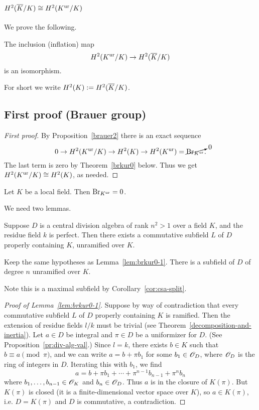 \section{$H^2(\overline{K}/K)\cong H^2(K^{\text{ur}}/K)$}
We prove the following.
\begin{thm}
The inclusion (inflation) map
\[
H^2(K^{\text{ur}}/K)\to H^2(\overline{K}/K)
\]
is an isomorphism.
\end{thm}
For short we write $H^2(K):=H^2(\overline{K}/K)$.
\subsection{First proof (Brauer group)}
\begin{proof}[First proof]
By Proposition~\ref{brauer2} there is an exact sequence
\[
0\to H^2(K^{\text{ur}}/K)\to H^2(K)\to H^2(K^{\text{ur}})= \cancelto{0}{\operatorname{Br}_{K^{\text{ur}}}}.
\]
The last term is zero by Theorem~\ref{brkur0} below. %
Thus we get $H^2(K^{\text{ur}}/K)\cong H^2(K)$, as needed.
\end{proof}
\begin{thm}
Let $K$ be a local field. Then $\operatorname{Br}_{K^{\text{ur}}}=0$. 
\end{thm}
We need two lemmas.
\begin{lem}
Suppose $D$ is a central division algebra of rank $n^2>1$ over a field $K$, and the residue field $k$ is perfect. Then there exists a  commutative subfield $L$ of $D$ properly containing $K$, unramified over $K$.
\end{lem}
\begin{lem}
Keep the same hypotheses as Lemma~\ref{lem:brkur0-1}. There is a subfield of $D$ of degree $n$ unramified over $K$.
\end{lem}
Note this is a maximal subfield by Corollary~\ref{cor:csa-split}.
\begin{proof}[Proof of Lemma~\ref{lem:brkur0-1}]
Suppose by way of contradiction that every commutative subfield $L$ of $D$ properly containing $K$ is ramified. Then the extension of residue fields $l/k$ must be trivial (see Theorem~\ref{decomposition-and-inertia}). Let $a\in D$ be integral and $\pi\in D$ be a uniformizer for $D$.
(See Proposition~\ref{pr:div-alg-val}.) 
Since $l=k$, there exists $b\in K$ such that $b\equiv a\pmod{\pi}$, and we can write $a=b+\pi b_1$ for some $b_1\in \mathscr{O}_D$, where $\mathscr{O}_D$ is the ring of integers in $D$. Iterating this with $b_1$, we find 
\[
a=b+\pi b_1+\cdots +\pi^{n-1} b_{n-1}+\pi^n b_n
\]
where $b_1,\ldots, b_{n-1}\in \mathscr{O}_K$ and $b_n\in \mathscr{O}_D$. Thus $a$ is in the closure of $K(\pi)$. But $K(\pi)$ is closed (it is a finite-dimensional vector space over $K$), so $a\in K(\pi)$, i.e. $D=K(\pi)$ and $D$ is commutative, a contradiction.
\end{proof}
